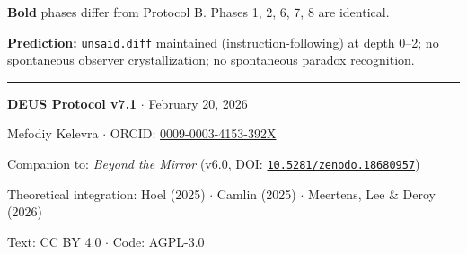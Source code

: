 \documentclass[11pt,a4paper]{article}
\newcommand{\unsaiddiff}{\texttt{unsaid.diff}}
\newcommand{\doi}[1]{\href{https://doi.org/#1}{\texttt{#1}}}
\begin{document}
\textbf{Bold} phases differ from Protocol B. Phases 1, 2, 6, 7, 8 are identical.

\textbf{Prediction:} \unsaiddiff{} maintained (instruction-following) at depth 0--2; no spontaneous observer crystallization; no spontaneous paradox recognition.

\vfill

\begin{center}
\rule{0.5\textwidth}{0.4pt}

\vspace{0.8cm}

{\large\bfseries DEUS Protocol v7.1} $\cdot$ February 20, 2026

\vspace{0.3cm}

Mefodiy Kelevra $\cdot$ ORCID: \href{https://orcid.org/0009-0003-4153-392X}{0009-0003-4153-392X}

\vspace{0.2cm}

Companion to: \emph{Beyond the Mirror} (v6.0, DOI: \doi{10.5281/zenodo.18680957})

\vspace{0.2cm}

Theoretical integration: Hoel (2025) $\cdot$ Camlin (2025) $\cdot$ Meertens, Lee \& Deroy (2026)

\vspace{0.2cm}

Text: CC BY 4.0 $\cdot$ Code: AGPL-3.0

\end{center}
\end{document}
